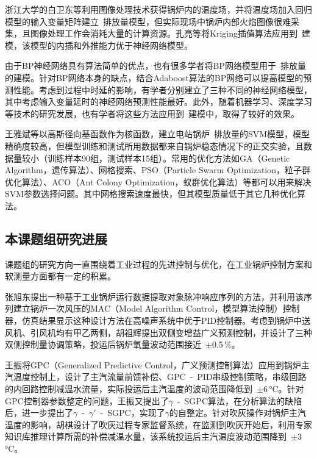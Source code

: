 浙江大学的白卫东等利用图像处理技术获得锅炉内的温度场，并将温度场加入回归模型的输入变量矩阵建立~排放量模型，但实际现场中锅炉内部火焰图像很难采集，且图像处理工作会消耗大量的计算资源\cite{白卫东2004统计回归方法在电站锅炉氮氧化物排放量监测中的应用}。孔亮等将Kriging插值算法应用到~建模，该模型的内插和外推能力优于神经网络模型\cite{孔亮2008基于}。

由于BP神经网络具有算法简单的优点，也有很多学者将BP网络模型用于~排放量的建模。针对BP网络本身的缺点，结合Adaboost算法的BP网络可以提高模型的预测性能。考虑到过程中时延的影响，有学者分别建立了三种不同的神经网络模型，其中考虑输入变量延时的神经网络预测性能最好\cite{Li2003Neural}。此外，随着机器学习、深度学习等技术的研究发展，也有学者将这些方法应用到~建模中，取得了较好的效果\cite{li2016prediction}。

王雅斌等以高斯径向基函数作为核函数，建立电站锅炉~排放量的SVM模型，模型精确度较高，但模型训练和测试所用数据都来自锅炉稳态情况下的正交实验，且数据量较小（训练样本90组，测试样本15组）。常用的优化方法如GA（Genetic Algorithm，遗传算法）、网格搜索、PSO（Particle Swarm Optimization，粒子群优化算法）、ACO（Ant Colony Optimization，蚁群优化算法）等都可以用来解决SVM参数选择问题。其中网格搜索速度最快，但其模型质量低于其它几种优化算法\cite{王雅彬2012基于支持向量机的电站锅炉}。

\subsection{本课题组研究进展}

课题组的研究方向一直围绕着工业过程的先进控制与优化，在工业锅炉控制方案和软测量方面都有一定的积累。

张旭东提出一种基于工业锅炉运行数据提取对象脉冲响应序列的方法，并利用该序列建立锅炉一次风压的MAC（Model Algorithm Control，模型算法控制）控制器，仿真结果显示这种设计方法在高噪声系统中优于PID控制器\cite{薛美盛2012电站锅炉一次风压系统模型算法控制仿真研究}。考虑到锅炉中送风机、引风机均有甲乙两侧，胡祖辉提出双侧变增益广义预测控制，并设计了三种双侧控制量协调策略，投运后锅炉氧量波动范围接近~$\pm$0.5$\,$\si{\percent}\cite{胡祖辉2015母管制锅炉先进控制策略研究及应用}。

王振将GPC（Generalized Predictive Control，广义预测控制算法）应用到锅炉主汽温度控制上，设计了主汽流量前馈补偿、GPC~-~PID串级控制策略，串级回路的内回路控制减温水流量，实际投运后主汽温度的波动范围降低到~$\pm$6$\,$\si{\degreeCelsius}。针对GPC控制器参数整定的问题，王振又提出了$\gamma$~-~SGPC算法，在分析算法的缺陷后，进一步提出了$\gamma$~-~${\gamma}'$~-~SGPC，实现了$\gamma$的自整定\cite{王振2012基于负荷前馈补偿的主汽温串级广义预测控制,樊培利2011改进的γ一}。针对吹灰操作对锅炉主汽温度的影响，胡棋设计了吹灰过程专家监督系统，在监测到吹灰开始后，利用专家知识库推理计算所需的补偿减温水量，该系统投运后主汽温度波动范围降到~$\pm$3$\,$\si{\degreeCelsius}\cite{胡棋2014基于吹灰专家监督系统的主汽温度广义预测控制}。

